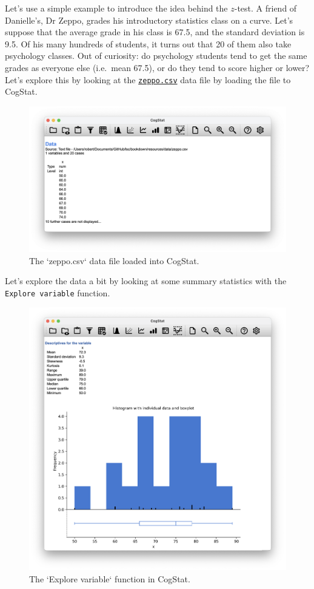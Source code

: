 \documentclass[
]{book}
\theoremstyle{definition}
\theoremstyle{definition}
\theoremstyle{definition}
\theoremstyle{definition}
\theoremstyle{remark}
\begin{document}
Let's use a simple example to introduce the idea behind the \(z\)-test. A friend of Danielle's, Dr Zeppo, grades his introductory statistics class on a curve. Let's suppose that the average grade in his class is 67.5, and the standard deviation is 9.5. Of his many hundreds of students, it turns out that 20 of them also take psychology classes. Out of curiosity: do psychology students tend to get the same grades as everyone else (i.e.~mean 67.5), or do they tend to score higher or lower? Let's explore this by looking at the \href{resources/data/zeppo.csv}{\texttt{zeppo.csv}} data file by loading the file to CogStat.

\begin{figure}

{\centering \includegraphics[width=0.66\linewidth]{resources/image/cogstatloadzeppo} 

}

\caption{The `zeppo.csv` data file loaded into CogStat.}\label{fig:cogstatloadzeppo}
\end{figure}

Let's explore the data a bit by looking at some summary statistics with the \texttt{Explore\ variable} function.

\begin{figure}

{\centering \includegraphics[width=0.66\linewidth]{resources/image/cogstatexplorezeppo} 

}

\caption{The `Explore variable` function in CogStat.}\label{fig:cogstatexplorezeppo}
\end{figure}
\end{document}
